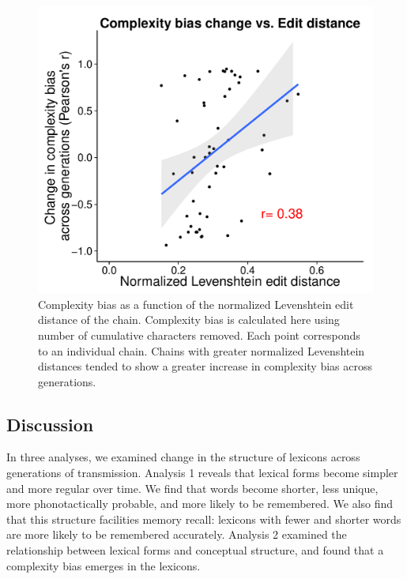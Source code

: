 \begin{figure}[t]
\begin{center}
\includegraphics[width = .8\linewidth]{figs/change_plot.pdf}
\end{center}
\vspace{-.5em}
\caption{Complexity bias as a function of the normalized Levenshtein edit distance of the chain. Complexity bias is calculated here using number of cumulative characters removed. Each point corresponds to an individual chain. Chains with greater normalized Levenshtein distances tended to show a greater increase in complexity bias across generations.}
\vspace{-1.5em}
\label{fig:levcbias}
\end{figure}


\subsection{Discussion}

In three analyses, we examined change in the structure of lexicons across generations of transmission. Analysis  1 reveals that lexical forms become simpler and more regular over time. We find that words become shorter, less unique, more phonotactically probable, and more likely to be remembered. We also find that this structure facilities memory recall: lexicons with fewer and shorter words are more likely to be remembered accurately. Analysis  2 examined the relationship between lexical forms and conceptual structure, and found that a complexity bias emerges in the lexicons. 

